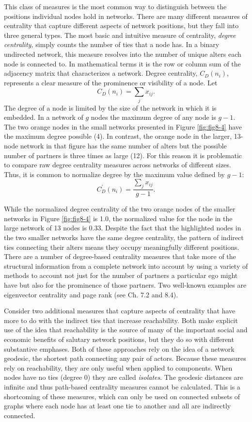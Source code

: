 \documentclass[]{krantz}
\begin{document}
This class of measures is the most common way to distinguish between the
positions individual nodes hold in networks. There are many different
measures of centrality that capture different aspects of network
positions, but they fall into three general types. The most basic and
intuitive measure of centrality, \emph{degree centrality,} simply counts
the number of ties that a node has. In a binary undirected network, this
measure resolves into the number of unique alters each node is connected
to. In mathematical terms it is the row or column sum of the adjacency
matrix that characterizes a network. Degree centrality,
\(C_{D}(n_{i})\), represents a clear measure of the prominence or
visibility of a node. Let \[C_D(n_i)=\sum_jx_{ij}.\] The degree of a
node is limited by the size of the network in which it is embedded. In a
network of \(g\) nodes the maximum degree of any node is \(g-1\). The
two orange nodes in the small networks presented in Figure
\ref{fig:fig8-4} have the maximum degree possible (4). In contrast, the
orange node in the larger, 13-node network in that figure has the same
number of alters but the possible number of partners is three times as
large (12). For this reason it is problematic to compare raw degree
centrality measures across networks of different sizes. Thus, it is
common to normalize degree by the maximum value defined by \(g-1\):
\[C_D^{\prime}(n_i)=\frac{\sum_j x_{ij}}{g-1}.\]

While the normalized degree centrality of the two orange nodes of the
smaller networks in Figure \ref{fig:fig8-4} is 1.0, the normalized value
for the node in the large network of 13 nodes is 0.33. Despite the fact
that the highlighted nodes in the two smaller networks have the same
degree centrality, the pattern of indirect ties connecting their alters
means they occupy meaningfully different positions. There are a number
of degree-based centrality measures that take more of the structural
information from a complete network into account by using a variety of
methods to account not just for the number of partners a particular ego
might have but also for the prominence of those partners. Two well-known
examples are eigenvector centrality and page rank (see
\citet{newman2010networks} Ch. 7.2 and 8.4).

Consider two additional measures that capture aspects of centrality that
have more to do with the indirect ties that increase reachability. Both
make explicit use of the idea that reachability is the source of many of
the important social and economic benefits of salutary network
positions, but they do so with different substantive emphases. Both of
these approaches rely on the idea of a network geodesic, the shortest
path connecting any pair of actors. Because these measures rely on
reachability, they are only useful when applied to components. When
nodes have no ties (degree 0) they are called \emph{isolates}. The
geodesic distances are infinite and thus path-based centrality measures
cannot be calculated. This is a shortcoming of these measures, which can
only be used on connected subsets of graphs where each node has at least
one tie to another and all are indirectly connected.
\end{document}
